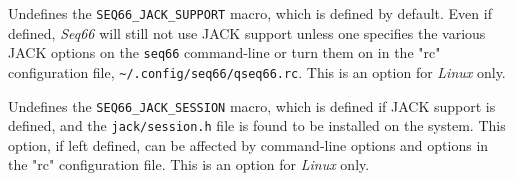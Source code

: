         Undefines the \texttt{SEQ66\_JACK\_SUPPORT} macro, which is
        defined by default.  Even if defined,
        \textsl{Seq66} will still not use JACK support unless
        one specifies the various JACK options on the \texttt{seq66}
        command-line or turn them on in the "rc" configuration file,
        \texttt{\textasciitilde/.config/seq66/qseq66.rc}.
        This is an option for \textsl{Linux} only.

        Undefines the \texttt{SEQ66\_JACK\_SESSION} macro, which is
        defined if JACK support is defined, and the
        \texttt{jack/session.h} file is found to be installed on the system.
        This option, if left defined, can be affected by
        command-line options and options in the "rc" configuration file.
        This is an option for \textsl{Linux} only.

%
%
%

